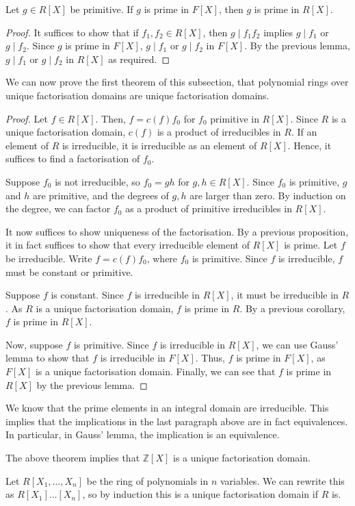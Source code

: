 \begin{lemma}
	Let $g \in R[X]$ be primitive.
	If $g$ is prime in $F[X]$, then $g$ is prime in $R[X]$.
\end{lemma}
\begin{proof}
	It suffices to show that if $f_1, f_2 \in R[X]$, then $g \mid f_1 f_2$ implies $g \mid f_1$ or $g \mid f_2$.
	Since $g$ is prime in $F[X]$, $g \mid f_1$ or $g \mid f_2$ in $F[X]$.
	By the previous lemma, $g \mid f_1$ or $g \mid f_2$ in $R[X]$ as required.
\end{proof}
We can now prove the first theorem of this subsection, that polynomial rings over unique factorisation domains are unique factorisation domains.
\begin{proof}
	Let $f \in R[X]$.
	Then, $f = c(f) f_0$ for $f_0$ primitive in $R[X]$.
	Since $R$ is a unique factorisation domain, $c(f)$ is a product of irreducibles in $R$.
	If an element of $R$ is irreducible, it is irreducible as an element of $R[X]$.
	Hence, it suffices to find a factorisation of $f_0$.

	Suppose $f_0$ is not irreducible, so $f_0 = gh$ for $g,h \in R[X]$.
	Since $f_0$ is primitive, $g$ and $h$ are primitive, and the degrees of $g, h$ are larger than zero.
	By induction on the degree, we can factor $f_0$ as a product of primitive irreducibles in $R[X]$.

	It now suffices to show uniqueness of the factorisation.
	By a previous proposition, it in fact suffices to show that every irreducible element of $R[X]$ is prime.
	Let $f$ be irreducible.
	Write $f = c(f) f_0$, where $f_0$ is primitive.
	Since $f$ is irreducible, $f$ must be constant or primitive.

	Suppose $f$ is constant.
	Since $f$ is irreducible in $R[X]$, it must be irreducible in $R$.
	As $R$ is a unique factorisation domain, $f$ is prime in $R$.
	By a previous corollary, $f$ is prime in $R[X]$.

	Now, suppose $f$ is primitive.
	Since $f$ is irreducible in $R[X]$, we can use Gauss' lemma to show that $f$ is irreducible in $F[X]$.
	Thus, $f$ is prime in $F[X]$, as $F[X]$ is a unique factorisation domain.
	Finally, we can see that $f$ is prime in $R[X]$ by the previous lemma.
\end{proof}
\begin{remark}
	We know that the prime elements in an integral domain are irreducible.
	This implies that the implications in the last paragraph above are in fact equivalences.
	In particular, in Gauss' lemma, the implication is an equivalence.
\end{remark}
\begin{example}
	The above theorem implies that $\mathbb Z[X]$ is a unique factorisation domain.

	Let $R[X_1, \dots, X_n]$ be the ring of polynomials in $n$ variables.
	We can rewrite this as $R[X_1]\dots[X_n]$, so by induction this is a unique factorisation domain if $R$ is.
\end{example}

